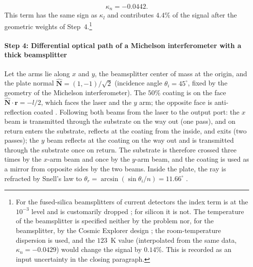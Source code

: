 \begin{equation}
\kappa_n=-0.0442 .
\end{equation}
This term has the same sign as $\kappa_l$ and contributes $4.4\%$ of the signal after the geometric weights of Step~4.\footnote{For the fused-silica beamsplitters of current detectors the index term is at the $10^{-3}$ level and is customarily dropped \citep{Vermeulen2021}; for silicon it is not. The temperature of the beamsplitter is specified neither by the problem nor, for the beamsplitter, by the Cosmic Explorer design \citep{Reitze2019}; the room-temperature dispersion is used, and the $123$~K value (interpolated from the same data, $\kappa_n=-0.0429$) would change the signal by $0.14\%$. This is recorded as an input uncertainty in the closing paragraph.}

\paragraph*{Step 4: Differential optical path of a Michelson interferometer with a thick beamsplitter}
Let the arms lie along $x$ and $y$, the beamsplitter center of mass at the origin, and the plate normal $\hat{\mathbf N}=(1,-1)/\sqrt2$ (incidence angle $\theta_i=45^\circ$, fixed by the geometry of the Michelson interferometer). The $50\%$ coating is on the face $\hat{\mathbf N}\cdot\mathbf r=-l/2$, which faces the laser and the $y$ arm; the opposite face is anti-reflection coated \citep[Fig.~1]{GroteStadnik2019}. Following both beams from the laser to the output port: the $x$ beam is transmitted through the substrate on the way out (one pass), and on return enters the substrate, reflects at the coating from the inside, and exits (two passes); the $y$ beam reflects at the coating on the way out and is transmitted through the substrate once on return. The substrate is therefore crossed three times by the $x$-arm beam and once by the $y$-arm beam, and the coating is used as a mirror from opposite sides by the two beams. Inside the plate, the ray is refracted by Snell's law to $\theta_r=\arcsin(\sin\theta_i/n)=11.66^\circ$ \citep[Sec.~1.5.1]{BornWolf1999}.

